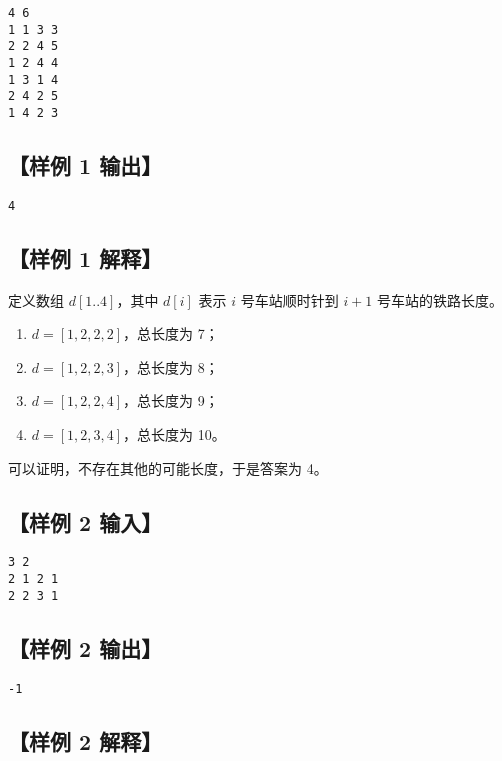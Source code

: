 \documentclass[11pt,a4paper,oneside]{article}
\begin{document}
\begin{verbatim}
4 6
1 1 3 3
2 2 4 5
1 2 4 4
1 3 1 4
2 4 2 5
1 4 2 3
\end{verbatim}

\subsection*{【样例 1 输出】}

\begin{verbatim}
4
\end{verbatim}

\subsection*{【样例 1 解释】}

定义数组 $d[1..4]$，其中 $d[i]$ 表示 $i$ 号车站顺时针到 $i+1$ 号车站的铁路长度。

\begin{enumerate}
  \item $d=[1,2,2,2]$，总长度为 7；
  \item $d=[1,2,2,3]$，总长度为 8；
  \item $d=[1,2,2,4]$，总长度为 9；
  \item $d=[1,2,3,4]$，总长度为 10。
\end{enumerate}

可以证明，不存在其他的可能长度，于是答案为 4。

\subsection*{【样例 2 输入】}

\begin{verbatim}
3 2
2 1 2 1
2 2 3 1
\end{verbatim}

\subsection*{【样例 2 输出】}

\begin{verbatim}
-1
\end{verbatim}

\subsection*{【样例 2 解释】}
\end{document}

